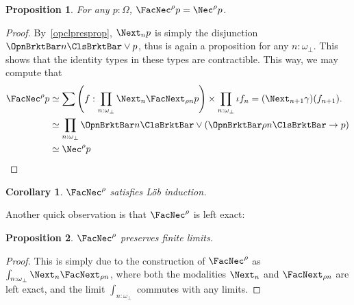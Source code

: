 \documentclass[a4paper,10pt]{amsart}
\newtheorem{corollary}{Corollary}[section]
\newtheorem{proposition}{Proposition}[section]
\theoremstyle{definition}
\newcommand{\prth}[1]{\left(#1\right)}
\newcommand{\ass}[1]{\OpnBrktBar#1\ClsBrktBar}
\newcommand{\ovob}{\omega_\bot}
\newcommand{\bx}{\FacNec}
\newcommand{\bbx}{\Nec}
\newcommand{\Prop}{\Omega}
\newcommand{\opm}[1]{\FacNext_{#1}}
\newcommand{\clm}[1]{\Next_{#1}}
\begin{document}
\begin{proposition}
  For any $p:\Prop$, $\bx^\rho p = \bbx^\rho p$.
\end{proposition}
\begin{proof}
  By~\cref{opclpresprop}, $\clm n p$ is simply the disjunction $\ass n \vee p$, thus is again a proposition for any $n:\ovob$. This shows that the identity types in these types are contractible. This way, we may compute that 
  \begin{align*}
    \bx^\rho p 
    &\simeq \sum\prth{f : \prod_{n:\ovob} \clm n \opm{\rho n} p} \times \prod_{n:\ovob} \iota f_n = (\clm{n+1}\gamma)(f_{n+1}). \\
    &\simeq \prod_{n:\ovob}\ass n \vee (\ass{\rho n} \to p) \\
    &\simeq \bbx^\rho p \qedhere
  \end{align*}
\end{proof}

\begin{corollary}\label{typelob}
  $\bx^\rho$ satisfies L\"ob induction.
\end{corollary}

Another quick observation is that $\bx^\rho$ is left exact:

\begin{proposition}\label{modalitypresfinitelimits}
  $\bx^\rho$ preserves finite limits.
\end{proposition}
\begin{proof}
  This is simply due to the construction of $\bx^\rho$ as $\int_{n:\ovob}\clm n\opm{\rho n}$, where both the modalities $\clm n$ and $\opm{\rho n}$ are left exact, and the limit $\int_{n:\ovob}$ commutes with any limits.
\end{proof}
\end{document}
